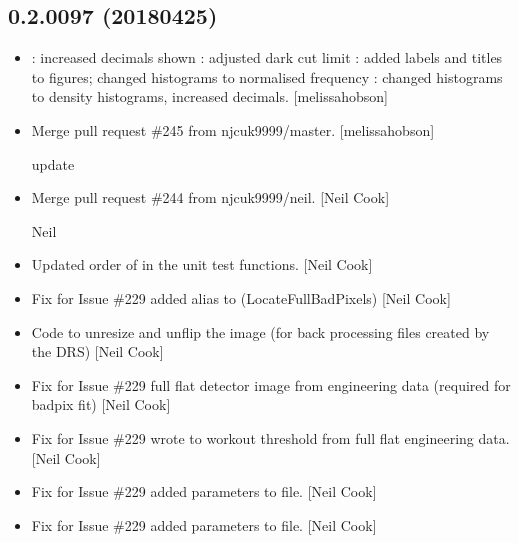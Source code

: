 \documentclass[a4paper,10pt,english]{report}
\begin{document}
\subsection{0.2.0097 (2018\sphinxhyphen{}04\sphinxhyphen{}25)}
\label{\detokenize{misc/changelog:id473}}\begin{itemize}
\item {} 
: increased decimals shown : adjusted
dark cut limit : added labels and titles to figures;
changed histograms to normalised frequency :
changed histograms to density histograms, increased decimals.
{[}melissa\sphinxhyphen{}hobson{]}

\item {} 
Merge pull request \#245 from njcuk9999/master. {[}melissa\sphinxhyphen{}hobson{]}

update

\item {} 
Merge pull request \#244 from njcuk9999/neil. {[}Neil Cook{]}

Neil

\item {} 
Updated order of  in the unit test functions. {[}Neil
Cook{]}

\item {} 
Fix for Issue \#229 \sphinxhyphen{} added alias to 
(LocateFullBadPixels) {[}Neil Cook{]}

\item {} 
Code to un\sphinxhyphen{}resize and un\sphinxhyphen{}flip the image (for back processing files
created by the DRS) {[}Neil Cook{]}

\item {} 
Fix for Issue \#229 \sphinxhyphen{} full flat detector image from engineering data
(required for badpix fit) {[}Neil Cook{]}

\item {} 
Fix for Issue \#229 \sphinxhyphen{} wrote  to workout threshold
from full flat engineering data. {[}Neil Cook{]}

\item {} 
Fix for Issue \#229 \sphinxhyphen{} added parameters to  file. {[}Neil
Cook{]}

\item {} 
Fix for Issue \#229 \sphinxhyphen{} added parameters to  file. {[}Neil
Cook{]}


\end{itemize}
\end{document}
